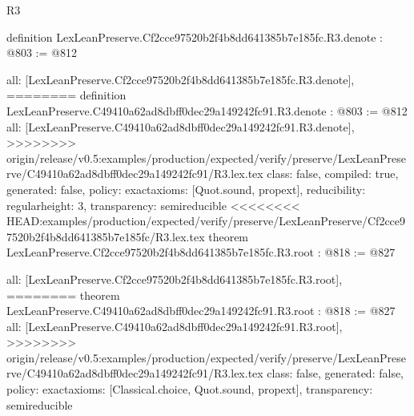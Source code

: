 \begin{lexlean}{R3}
\begin{coremodule}
{{{{{{definition LexLeanPreserve.Cf2cce97520b2f4b8dd641385b7e185fc.R3.denote : @803 := @812 {
  all: [LexLeanPreserve.Cf2cce97520b2f4b8dd641385b7e185fc.R3.denote],
========
definition LexLeanPreserve.C49410a62ad8dbff0dec29a149242fc91.R3.denote : @803 := @812 {
  all: [LexLeanPreserve.C49410a62ad8dbff0dec29a149242fc91.R3.denote],
>>>>>>>> origin/release/v0.5:examples/production/expected/verify/preserve/LexLeanPreserve/C49410a62ad8dbff0dec29a149242fc91/R3.lex.tex
  class: false,
  compiled: true,
  generated: false,
  policy: exact{axioms: [Quot.sound, propext]},
  reducibility: regular{height: 3},
  transparency: semireducible
}
<<<<<<<< HEAD:examples/production/expected/verify/preserve/LexLeanPreserve/Cf2cce97520b2f4b8dd641385b7e185fc/R3.lex.tex
theorem LexLeanPreserve.Cf2cce97520b2f4b8dd641385b7e185fc.R3.root : @818 := @827 {
  all: [LexLeanPreserve.Cf2cce97520b2f4b8dd641385b7e185fc.R3.root],
========
theorem LexLeanPreserve.C49410a62ad8dbff0dec29a149242fc91.R3.root : @818 := @827 {
  all: [LexLeanPreserve.C49410a62ad8dbff0dec29a149242fc91.R3.root],
>>>>>>>> origin/release/v0.5:examples/production/expected/verify/preserve/LexLeanPreserve/C49410a62ad8dbff0dec29a149242fc91/R3.lex.tex
  class: false,
  generated: false,
  policy: exact{axioms: [Classical.choice, Quot.sound, propext]},
  transparency: semireducible
}

}}}}}}}}
\end{coremodule}
\end{lexlean}
